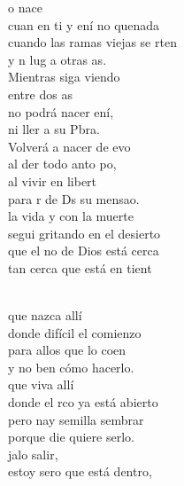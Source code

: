 \documentclass[12pt]{article}
\begin{document}
\begin{multicols*}{2}
\begin{cancion}%
	o nace  \\
	cuan en ti y ení no quenada\\
	cuando las ramas viejas se rten\\
	y n lug a otras as.\\
\jump
	Mientras siga viendo   \\
	entre dos as \\
	no podrá nacer ení,\\
	ni ller a  su Pbra. \\
\jump
	Volverá a nacer de evo\\
	al der todo anto po, \\
	al vivir en libert\\
	para r de Ds su mensao.\\
\jump
	 la vida y con la muerte\\
	segui gritando en el desierto  \\
	que el no de Dios está cerca\\
	tan cerca que está en tient\\\jump\\
	\begin{chorus}%
	 que nazca allí\\
	donde  difícil el comienzo\\
	para allos que lo coen\\
	y no ben cómo hacerlo.\\
\jump
	 que viva allí\\
	donde el rco ya está abierto\\
	pero nay semilla  sembrar\\
	porque die quiere serlo.\\
\jump
	jalo salir,\\
	estoy sero que está dentro,\\

\end{chorus}
\end{cancion}
\end{multicols*}
\end{document}
